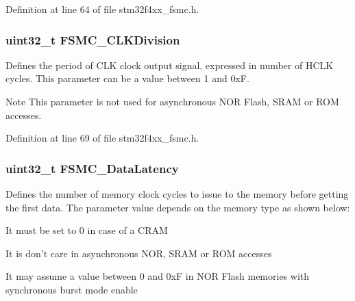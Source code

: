 Definition at line 64 of file stm32f4xx\-\_\-fsmc.\-h.

\hypertarget{struct_f_s_m_c___n_o_r_s_r_a_m_timing_init_type_def_a4258c6027193e72763ab139cfd3af065}{
\subsubsection[{F\-S\-M\-C\-\_\-\-C\-L\-K\-Division}]{\setlength{\rightskip}{0pt plus 5cm}uint32\-\_\-t F\-S\-M\-C\-\_\-\-C\-L\-K\-Division}}\label{struct_f_s_m_c___n_o_r_s_r_a_m_timing_init_type_def_a4258c6027193e72763ab139cfd3af065}
Defines the period of C\-L\-K clock output signal, expressed in number of H\-C\-L\-K cycles. This parameter can be a value between 1 and 0x\-F. \begin{DoxyNote}{Note}
This parameter is not used for asynchronous N\-O\-R Flash, S\-R\-A\-M or R\-O\-M accesses. 
\end{DoxyNote}


Definition at line 69 of file stm32f4xx\-\_\-fsmc.\-h.

\hypertarget{struct_f_s_m_c___n_o_r_s_r_a_m_timing_init_type_def_a656a0608f822088c5a94c926447a5e06}{
\subsubsection[{F\-S\-M\-C\-\_\-\-Data\-Latency}]{\setlength{\rightskip}{0pt plus 5cm}uint32\-\_\-t F\-S\-M\-C\-\_\-\-Data\-Latency}}\label{struct_f_s_m_c___n_o_r_s_r_a_m_timing_init_type_def_a656a0608f822088c5a94c926447a5e06}
Defines the number of memory clock cycles to issue to the memory before getting the first data. The parameter value depends on the memory type as shown below\-:
\begin{DoxyItemize}
\item It must be set to 0 in case of a C\-R\-A\-M
\item It is don't care in asynchronous N\-O\-R, S\-R\-A\-M or R\-O\-M accesses
\item It may assume a value between 0 and 0x\-F in N\-O\-R Flash memories with synchronous burst mode enable 
\end{DoxyItemize}

